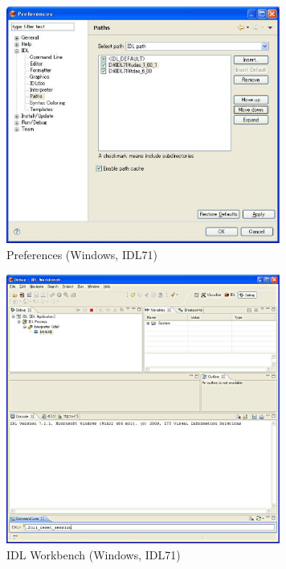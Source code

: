 \documentclass[a4j]{jbook}
\begin{document}
\begin{figure}[H]
\begin{center}
\includegraphics[width=9cm]{fig_idl71/Fig5.eps}
\caption{Preferences (Windows, IDL71)}
\label{idl71/Fig5.eps}
\end{center}
\end{figure}

\begin{figure}[H]
\begin{center}
\includegraphics[width=9cm]{fig_idl71/Fig6.eps}
\caption{IDL Workbench (Windows, IDL71)}
\label{idl71/Fig6.eps}
\end{center}
\end{figure}

\end{document}
